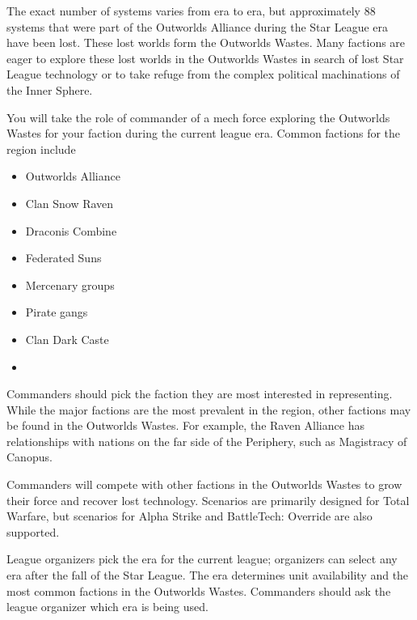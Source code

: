 \documentclass{article}
\begin{document}
The exact number of systems varies from era to era, but approximately 88 systems that were part of the Outworlds Alliance during the Star League era have been lost.
These lost worlds form the Outworlds Wastes.
Many factions are eager to explore these lost worlds in the Outworlds Wastes in search of lost Star League technology or to take refuge from the complex political machinations of the Inner Sphere.

You will take the role of commander of a mech force exploring the Outworlds Wastes for your faction during the current league era.
Common factions for the region include

\begin{multicols}{2}

\begin{itemize}

\item Outworlds Alliance

\item Clan Snow Raven

\item Draconis Combine

\item Federated Suns

\item Mercenary groups

\item Pirate gangs

\item Clan Dark Caste

\item[\vspace{\fill}]

\end{itemize}

\end{multicols}

Commanders should pick the faction they are most interested in representing.
While the major factions are the most prevalent in the region, other factions may be found in the Outworlds Wastes.
For example, the Raven Alliance has relationships with nations on the far side of the Periphery, such as Magistracy of Canopus.

Commanders will compete with other factions in the Outworlds Wastes to grow their force and recover lost technology.
Scenarios are primarily designed for Total Warfare, but scenarios for Alpha Strike and BattleTech: Override are also supported.

League organizers pick the era for the current league; organizers can select any era after the fall of the Star League.
The era determines unit availability and the most common factions in the Outworlds Wastes.
Commanders should ask the league organizer which era is being used.
\end{document}

